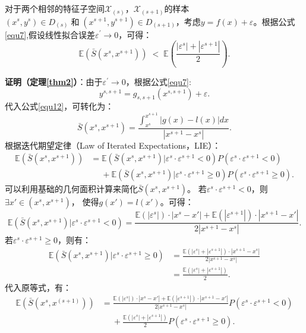 \documentclass{NauThesis}
\begin{document}
\begin{theorem}\label{thm2}
	对于两个相邻的特征子空间$\mathcal{X}_{(s)}$，$\mathcal{X}_{(s+1)}$的样本$(x^s,y^s)\in{D}_{(s)}\;\text{和}\; (x^{s+1},y^{s+1})\in{D}_{(s+1)}$，考虑$y=f(x)+\varepsilon$。根据公式\eqref{equ7},假设线性拟合误差$\varepsilon^\prime\rightarrow0$，可得：
    \begin{equation}
        \mathbb{E}(\bar{S}(x^s,x^{s+1}))\;<\;\mathbb{E}(\frac{|\varepsilon^s|+|\varepsilon^{s+1}|}{2}).    
    \end{equation}
\end{theorem}
\noindent \textbf{证明（定理\ref{thm2}）}：由于$\varepsilon^\prime\rightarrow0$，根据公式\eqref{equ7}:
$$y^{s,s+1}=g_{s,s+1}(x^{s,s+1})+\varepsilon.$$
代入公式\eqref{equ12}，可转化为：
$$\bar{S}(x^s,x^{s+1})=\frac{\int_{x^s}^{x^{s+1}}|g(x)-l(x)| dx}{|x^{s+1}-x^s|}.$$
根据迭代期望定律（Law of Iterated Expectations，LIE）：
$$\begin{aligned}
    \mathbb{E}(\bar{S}(x^s,x^{s+1}))&=\mathbb{E}(\bar{S}(x^s,x^{s+1})|\varepsilon^s\cdot\varepsilon^{s+1}<0)P(\varepsilon^s\cdot\varepsilon^{s+1}<0)\\
    &\quad\; +\mathbb{E}(\bar{S}(x^s,x^{s+1})|\varepsilon^s\cdot\varepsilon^{s+1}\ge0)P(\varepsilon^s\cdot\varepsilon^{s+1}\ge0).
    \end{aligned}$$
可以利用基础的几何面积计算来简化$\bar{S}(x^s,x^{s+1})$。
若$\varepsilon^s\cdot\varepsilon^{s+1}<0$，则$\exists{x'}\in(x^s,x^{s+1})$，
使得$g(x')=l(x')$。可得：
$$\mathbb{E}(\bar{S}(x^s,x^{s+1})|\varepsilon^s\cdot\varepsilon^{s+1}<0)=\frac{\mathbb{E}(|\varepsilon^s|)\cdot|x^s-x'|+\mathbb{E}(|\varepsilon^{s+1}|)\cdot|x^{s+1}-x'|}{2|x^{s+1}-x^s|}.$$
若$\varepsilon^s\cdot\varepsilon^{s+1}\ge0$，则有：
$$\begin{aligned}
    \mathbb{E}(\bar{S}(x^s,x^{s+1})|\varepsilon^s\cdot\varepsilon^{s+1}\ge0)&=\frac{\mathbb{E}(|\varepsilon^s|+|\varepsilon^{s+1}|)\cdot|x^{s+1}-x^{s}|}{2|x^{s+1}-x^s|}\\&=\frac{\mathbb{E}(|\varepsilon^s|+|\varepsilon^{s+1}|)}{2}.
    \end{aligned}$$
代入原等式，有：
$$\begin{aligned}
    \mathbb{E}({\bar{S}(x^{s}, x^{(s+1)})})&=
    \frac{{\mathbb{E}(|\varepsilon^s|)\cdot|x^s-x'|+\mathbb{E}(|\varepsilon^{s+1}|)\cdot|x^{s+1}-x'|}}{2|x^{s+1}-x^s|}P(\varepsilon^s\cdot\varepsilon^{s+1}<0)\\
    &\;\quad+\frac{\mathbb{E}(|\varepsilon^s|+|\varepsilon^{s+1}|)}{2}P(\varepsilon^s\cdot\varepsilon^{s+1}\ge0).
    \end{aligned}$$
\end{document}
